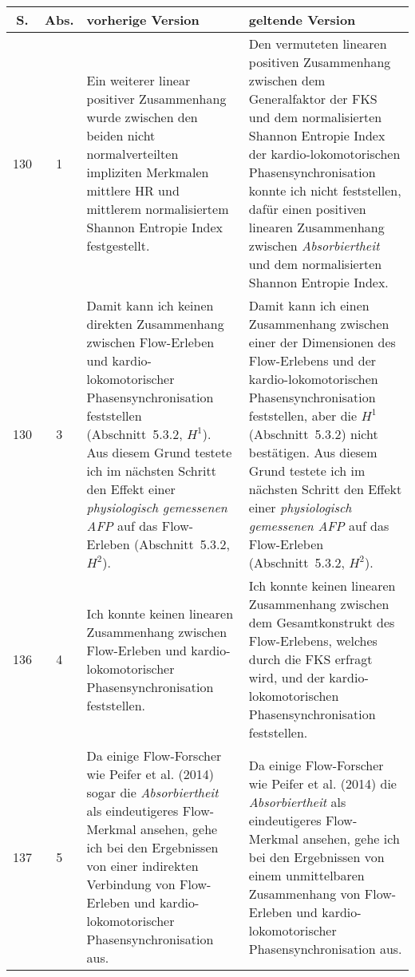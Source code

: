 \documentclass[12pt, twoside=semi, DIV=calc, pagesize, parskip=half, listof=totoc, bibliography=totoc, open=right, listof=nochaptergap, pointlessnumbers, final]{scrreprt}
\begin{document}
	\begin{tabularx}{\textwidth}{|c|c|X|X|} 
	\hline
	\textbf{S.} & \textbf{Abs.} & \textbf{vorherige Version} & \textbf{geltende Version}\\
	\hline
	\endhead
		130 & 1 & Ein weiterer linear positiver Zusammenhang wurde zwischen den beiden nicht normalverteilten impliziten Merkmalen mittlere HR und mittlerem normalisiertem Shannon Entropie Index festgestellt. & Den vermuteten linearen positiven Zusammenhang zwischen dem Generalfaktor der FKS und dem normalisierten Shannon Entropie Index der kardio-lokomotorischen Phasensynchronisation konnte ich nicht feststellen, dafür einen positiven linearen Zusammenhang zwischen \emph{Absorbiertheit} und dem normalisierten Shannon Entropie Index.\\
		\hline
		130 & 3 & Damit kann ich keinen direkten Zusammenhang zwischen Flow-Erleben und kardio-lokomotorischer Phasensynchronisation feststellen (Abschnitt~5.3.2, $H^1$). Aus diesem Grund testete ich im nächsten Schritt den Effekt einer \emph{physiologisch gemessenen AFP} auf das Flow-Erleben (Abschnitt~5.3.2, $H^2$). & Damit kann ich einen Zusammenhang zwischen einer der Dimensionen des Flow-Erlebens und der kardio-lokomotorischen Phasensynchronisation feststellen, aber die $H^1$ (Abschnitt~5.3.2) nicht bestätigen. Aus diesem Grund testete ich im nächsten Schritt den Effekt einer \emph{physiologisch gemessenen AFP} auf das Flow-Erleben (Abschnitt~5.3.2, $H^2$).\\
		\hline
		136 & 4 & Ich konnte keinen linearen Zusammenhang zwischen Flow-Erleben und kardio-lokomotorischer Phasensynchronisation feststellen. & Ich konnte keinen linearen Zusammenhang zwischen dem Gesamtkonstrukt des Flow-Erlebens, welches durch die FKS erfragt wird, und der kardio-lokomotorischen Phasensynchronisation feststellen.\\
		\hline
		137 & 5 & Da einige Flow-Forscher wie Peifer et al. (2014) sogar die \emph{Absorbiertheit} als eindeutigeres Flow-Merkmal ansehen, gehe ich bei den Ergebnissen von einer indirekten Verbindung von Flow-Erleben und kardio-lokomotorischer Phasensynchronisation aus. & Da einige Flow-Forscher wie Peifer et al. (2014) die \emph{Absorbiertheit} als eindeutigeres Flow-Merkmal ansehen, gehe ich bei den Ergebnissen von einem unmittelbaren Zusammenhang von Flow-Erleben und kardio-lokomotorischer Phasensynchronisation aus.\\
		

\end{tabularx}
\end{document}
